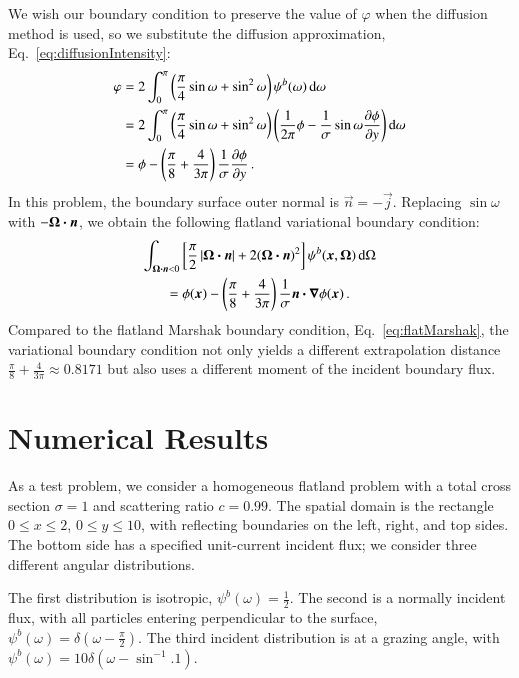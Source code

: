 \documentclass{anstrans}
\begin{document}
We wish our boundary condition to preserve the value of $\varphi$ when the
diffusion method is used, so we substitute the diffusion approximation,
Eq.~\eqref{eq:diffusionIntensity}:
\begin{align*}
 \varphi &= 2\int_{0}^{\pi} \left( \frac{\pi}{4} \sin\omega + \sin^2\omega \right)
 \psi^b(\omega) \mathop{}\!\mathrm{d}\omega
 \\
 &= 
  2\int_{0}^{\pi} \left( \frac{\pi}{4} \sin\omega + \sin^2\omega \right)
 \left( \frac{1}{2\pi} \phi -
  \frac{1}{\sigma} \sin\omega \frac{\partial \phi}{\partial y}\right)\mathop{}\!\mathrm{d}\omega
\\
 &= 
  \phi
- \left( \frac{\pi}{8} + \frac{4}{3\pi} \right) \frac{1}{\sigma} \frac{\partial \phi}{\partial y}
\,.
\end{align*}
In this problem, the boundary surface outer normal is $\vec{n}=-\vec{j}$. 
Replacing $\sin \omega$ with $-\bm{\Omega}\bm{\cdot}\bm{n}$, we obtain the following
flatland variational boundary condition:
\begin{multline} \label{eq:flatVarBc}
\int_{\bm{\Omega}\bm{\cdot}\bm{n} < 0} \left[ \frac{\pi}{2}
\left| \bm{\Omega}\bm{\cdot}\bm{n} \right| + 2 (\bm{\Omega}\bm{\cdot}\bm{n})^2 \right]
\psi^b(\bm{x}, \bm{\Omega}) \mathop{}\!\mathrm{d}\Omega
\\
= 
  \phi(\bm{x})
  - \left( \frac{\pi}{8} + \frac{4}{3\pi} \right) \frac{1}{\sigma}
  \bm{n}\bm{\cdot}\bm{\nabla} \phi(\bm{x})\,.
\end{multline}
Compared to the flatland Marshak boundary condition,
Eq.~\eqref{eq:flatMarshak}, the variational boundary condition not only yields a
different extrapolation distance $\frac{\pi}{8} + \frac{4}{3\pi} \approx
0.8171$ but also uses a different moment of the incident boundary flux.

\section{Numerical Results}
As a test problem, we consider a homogeneous flatland problem with a
total cross section $\sigma=1$ and scattering ratio $c=0.99$. The spatial 
domain is the rectangle $0 \le x \le 2$, \linebreak $0 \le y \le 10$, with
reflecting boundaries on the left,
right, and top sides. The bottom side has a specified unit-current incident
flux; we consider three different angular
distributions.

The first distribution is isotropic, $\psi^b(\omega) = \frac{1}{2}$. The second
is a normally incident flux, with all particles entering
perpendicular to the surface, $\psi^b(\omega) = \delta(\omega -
\frac{\pi}{2})$. The third incident distribution is at a grazing angle, with 
$\psi^b(\omega) = 10 \delta(\omega - \sin^{-1}.1)$.
\end{document}
